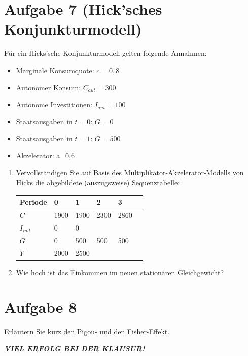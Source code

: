 \documentclass{scrartcl}
\begin{document}
\section*{Aufgabe 7 (Hick'sches Konjunkturmodell)}
F\"{u}r ein Hicks'sche Konjunkturmodell gelten folgende Annahmen:
\begin{multicols}{2}
	\begin{itemize}
		\item Marginale Konsumquote: $c = 0,8$
		\item Autonomer Konsum: $C_{aut} = 300$
		\item Autonome Investitionen: $I_{aut} = 100$
		\item Staatsausgaben in $t=0$: $G = 0$
		\item Staatsausgaben in $t=1$: $G = 500$
		\item Akzelerator: a=0,6
	\end{itemize}
\end{multicols}
\begin{enumerate}
	\item Vervollst\"{a}ndigen Sie auf Basis des Multiplikator-Akzelerator-Modells von Hicks die abgebildete (auszugsweise) Sequenztabelle:
	\begin{center}
		\begin{tabular}{|l|l|l|l|l|l|}
			\hline
			Periode      & 0    & 1    & 2    & 3 \\ \hline
			$C$          & 1900 & 1900 & 2300 & 2860      \\ \hline
			$I_{ind}$    & 0    & 0    &      &        \\ \hline
			$G$          & 0    & 500  & 500  & 500       \\ \hline
			$Y$          & 2000 & 2500 &      &           \\ \hline
		\end{tabular}
	\end{center}
	\item Wie hoch ist das Einkommen im neuen station\"{a}ren Gleichgewicht?
\end{enumerate}

\section*{Aufgabe 8}
Erl\"{a}utern Sie kurz den Pigou- und den Fisher-Effekt.
\begin{center} \Huge \emph{\textbf{VIEL ERFOLG BEI DER KLAUSUR!}}
\end{center}
\end{document}
